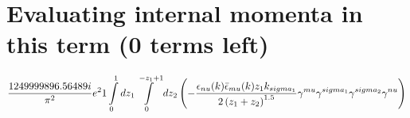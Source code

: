 \section*{Evaluating internal momenta in this term (0 terms left)}
\begin{dmath}\frac{1249999896.56489 i}{\pi^{2}} e^{2}1\int\limits_{ 0 }^{ 1 } d{ z_{ 1 } }\int\limits_{ 0 }^{ - { z_{ 1 } } + 1 } d{ z_{ 2 } }\left(- \frac{\epsilon_{ \\nu }({ k }) \bar{\epsilon}_{ \\mu }({ k }) { z_{ 1 } } { { k }_{ \\sigma_1 } }}{2 \left({ z_{ 1 } } + { z_{ 2 } }\right)^{1.5}} { \gamma^{ \\mu } } { \gamma^{ \\sigma_1 } } { \gamma^{ \\sigma_2 } } { \gamma^{ \\nu } }\right)\end{dmath}

